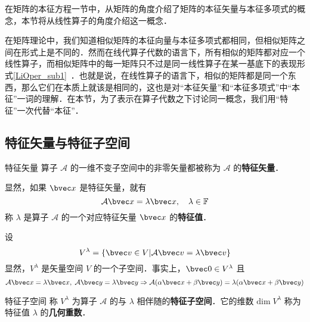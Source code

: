 在矩阵的本征方程一节中，从矩阵的角度介绍了矩阵的本征矢量与本征多项式的概念，本节将从线性算子的角度介绍这一概念．

在矩阵理论中，我们知道相似矩阵的本征向量与本征多项式都相同，但相似矩阵之间在形式上是不同的．然而在线代算子代数的语言下，所有相似的矩阵都对应一个线性算子，而相似矩阵中的每一矩阵只不过是同一线性算子在某一基底下的表现形式\autoref{LiOper_sub1}~．也就是说，在线性算子的语言下，相似的矩阵都是同一个东西，那么它们在本质上就该是相同的，这也是对“本征矢量”和“本征多项式”中“本征”一词的理解．在本节，为了表示在算子代数之下讨论同一概念，我们用“特征”一次代替“本征”．
\subsection{特征矢量与特征子空间}
\begin{definition}{特征矢量}
算子 $\mathcal{A}$ 的一维不变子空间中的非零矢量都被称为 $\mathcal{A}$ 的\textbf{特征矢量}．
\end{definition}
显然，如果 $\bvec x$ 是特征矢量，就有
\begin{equation}\label{EigVM_eq1}
\mathcal{A}\bvec x=\lambda \bvec x,\quad \lambda\in\mathbb{F}
\end{equation}
称 $\lambda$ 是算子 $\mathcal{A}$ 的一个对应特征矢量 $\bvec x$ 的\textbf{特征值}．

设
\begin{equation}
V^{\lambda}=\{\bvec v\in V|\mathcal{A}\bvec v=\lambda \bvec v\}
\end{equation}
显然，$V^{\lambda}$ 是矢量空间 $V$ 的一个子空间．事实上，$\bvec 0\in V^{\lambda}$ 且
\begin{equation}
\mathcal{A}\bvec x=\lambda \bvec x,\;\mathcal{A}\bvec y=\lambda \bvec y\Rightarrow\mathcal{A}(\alpha\bvec x+\beta\bvec y)=\lambda(\alpha\bvec x+\beta \bvec y)
\end{equation}
\begin{definition}{特征子空间}
称 $V^{\lambda}$ 为算子 $\mathcal{A}$ 的与 $\lambda$ 相伴随的\textbf{特征子空间}．它的维数 $\mathrm{dim}\;V^{\lambda}$ 称为特征值 $\lambda$ 的\textbf{几何重数}． 
\end{definition}
